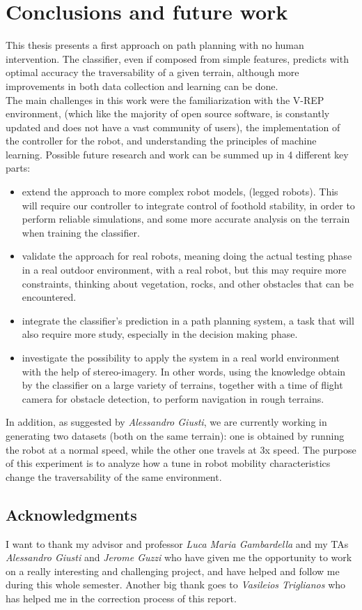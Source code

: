 \documentclass[]{usiinfbachelorproject}
\begin{document}
\section{Conclusions and future work}
This thesis presents a first approach on path planning with no human intervention. The classifier, even if composed from simple features, predicts with optimal accuracy the traversability of a
given terrain, although more improvements in both data collection and learning can be done. \\
The main challenges in this work were the familiarization with the V-REP environment, (which like the majority of open source software, is constantly updated and does not have  a vast community 
of users), the implementation of the controller for the robot, and understanding the principles of machine learning.
Possible future research and work can be summed up in 4 different key parts:
\begin{itemize}
    \item
        extend the approach to more complex robot models, (legged robots). This will require our controller to integrate control of foothold stability, in order to perform
        reliable simulations, and some more accurate analysis on the terrain when training the classifier.
    \item
        validate the approach for real robots, meaning doing the actual testing phase in a real outdoor environment, with a real robot, but this may require more constraints,
        thinking about vegetation, rocks, and other obstacles that can be encountered.
    \item
        integrate the classifier's prediction in a path planning system, a task that will also require more study, especially in the decision making phase.
    \item
        investigate the possibility to apply the system in a real world environment with the help of stereo-imagery. In other words, using the knowledge obtain by the classifier on a large variety
        of terrains, together with a time of flight camera for obstacle detection, to perform navigation in rough terrains.
\end{itemize}
In addition, as suggested by \textit{Alessandro Giusti}, we are currently working in generating two datasets (both on the same terrain): one is obtained by running the robot at a normal speed, while
the other one travels at 3x speed. The purpose of this experiment is to analyze how a tune in robot mobility characteristics change the traversability of the same environment.

\subsection{Acknowledgments}
I want to thank my advisor and professor \textit{Luca Maria Gambardella} and my TAs \textit{Alessandro Giusti} and \textit{Jerome Guzzi} who have given me the opportunity to work on a really interesting and 
challenging project, and have helped and follow me during this whole semester. Another big thank goes to \textit{Vasileios Triglianos} who has helped me in the correction process of this report.

\newpage


\end{document}
